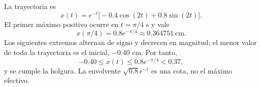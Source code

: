 La trayectoria es
\[
x(t)=e^{-t}\bigl[-0.4\cos(2t)+0.8\sin(2t)\bigr].
\]
El primer máximo positivo ocurre en \(t=\pi/4\) s y vale
\[
x(\pi/4)=0.8e^{-\pi/4}\approx0.364751\ \mathrm{cm}.
\]
Los siguientes extremos alternan de signo y decrecen en magnitud; el menor valor de toda la trayectoria es el inicial, \(-0.40\) cm. Por tanto,
\[
-0.40\le x(t)\le0.8e^{-\pi/4}<0.37,
\]
y se cumple la holgura. La envolvente \(\sqrt{0.8}e^{-t}\) es una cota, no el máximo efectivo.
